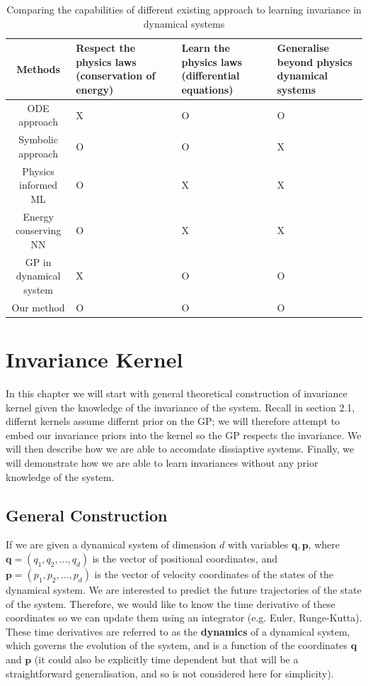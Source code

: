 \documentclass{statsmsc}
\begin{document}
\begin{table}[H]
    \centering
\begin{tabularx}{\linewidth}{c|LLL} 
    \hline
 Methods & Respect the physics laws (conservation of energy) & Learn the physics laws (differential equations) & Generalise beyond physics dynamical systems  \\ 
    \hline
  ODE approach & X & O & O \\
  Symbolic approach & O & O & X \\
  Physics informed ML & O & X & X \\
  Energy conserving NN & O & X & X \\
  GP in dynamical system & X & O & O\\
  Our method & O & O & O\\
    \hline
\end{tabularx}
\caption{Comparing the capabilities of different existing approach to learning invariance in dynamical systems}
\label{tab:compare}
    \end{table}



\chapter{Invariance Kernel}
In this chapter we will start with general theoretical construction of invariance kernel given the knowledge of the invariance of the system.
Recall in section 2.1, differnt kernels assume differnt prior on the GP; we will therefore attempt to embed our invariance priors into the kernel so the GP respects the invariance.
We will then describe how we are able to accomdate dissiaptive systems.
Finally, we will demonstrate how we are able to learn invariances without any prior knowledge of the system.

\section{General Construction}
If we are given a dynamical system of dimension $d$ with variables $\mathbf{q}, \mathbf{p}$, where $\mathbf{q} = (q_1, q_2,\dots,q_d)$ is the vector of positional coordinates, and $\mathbf{p}=(p_1, p_2, \dots, p_d)$ is the vector of velocity coordinates of the states of the dynamical system.
We are interested to predict the future trajectories of the state of the system.
Therefore, we would like to know the time derivative of these coordinates so we can update them using an integrator (e.g. Euler, Runge-Kutta). 
These time derivatives are referred to as the \textbf{dynamics} of a dynamical system, which governs the evolution of the system, and is a function of the coordinates $\mathbf{q}$ and $\mathbf{p}$ (it could also be explicitly time dependent but that will be a straightforward generalisation, and so is not considered here for simplicity). 
\end{document}
